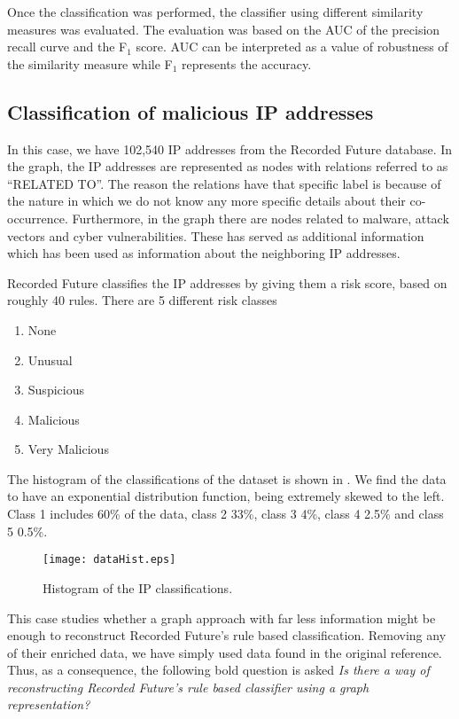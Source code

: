 Once the classification was performed, the classifier using different similarity measures was evaluated. The evaluation was based on the AUC of the precision recall curve and the F$_1$ score. AUC can be interpreted as a value of robustness of the similarity measure while F$_1$ represents the accuracy.

\subsection{Classification of malicious IP addresses}
In this case, we have 102,540 IP addresses from the Recorded Future database. In the graph, the IP addresses are represented as nodes with relations referred to as ``RELATED TO''. The reason the relations have that specific label is because of the nature in which we do not know any more specific details about their co-occurrence. Furthermore, in the graph there are nodes related to malware, attack vectors and cyber vulnerabilities. These has served as additional information which has been used as information about the neighboring IP addresses.

Recorded Future classifies the IP addresses by giving them a risk score, based on roughly 40 rules. There are 5 different risk classes
\begin{enumerate}
    \item None
    \item Unusual
    \item Suspicious
    \item Malicious
    \item Very Malicious
\end{enumerate}

The histogram of the classifications of the dataset is shown in . We find the data to have an exponential distribution function, being extremely skewed to the left. Class 1 includes 60\% of the data, class 2 33\%, class 3 4\%, class 4 2.5\% and class 5 0.5\%. 

\begin{figure}[h!]
    \centering
    \texttt{[image: dataHist.eps]}
    \caption{Histogram of the IP classifications.}
    \label{hist}
\end{figure}

This case studies whether a graph approach with far less information might be enough to reconstruct Recorded Future's rule based classification. Removing any of their enriched data, we have simply used data found in the original reference. Thus, as a consequence, the following bold question is asked \textit{Is there a way of reconstructing Recorded Future's rule based classifier using a graph representation?} 

